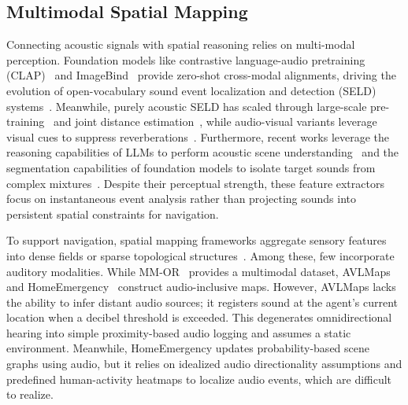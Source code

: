 \subsection{Multimodal Spatial Mapping}
Connecting acoustic signals with spatial reasoning relies on multi-modal perception. Foundation models like contrastive language-audio pretraining (CLAP)~\cite{CLAPLearningAudio2023} and ImageBind~\cite{ImageBindOneEmbedding2023} provide zero-shot cross-modal alignments, driving the evolution of open-vocabulary sound event localization and detection (SELD) systems~\cite{OpenvocabularySoundEvent2025}. Meanwhile, purely acoustic SELD has scaled through large-scale pre-training~\cite{PSELDNetsPretrainedNeural2025} and joint distance estimation~\cite{ExperimentalStudyJoint2025}, while audio-visual variants leverage visual cues to suppress reverberations~\cite{MVANetMultistageVideo2025}. Furthermore, recent works leverage the reasoning capabilities of LLMs to perform acoustic scene understanding~\cite{BATLearningReason2024} and the segmentation capabilities of foundation models to isolate target sounds from complex mixtures~\cite{SAMAudioSegment2025}. Despite their perceptual strength, these feature extractors focus on instantaneous event analysis rather than projecting sounds into persistent spatial constraints for navigation.

To support navigation, spatial mapping frameworks aggregate sensory features into dense fields or sparse topological structures~\cite{3DDynamicScene2020, ConceptFusionOpensetMultimodal2023, ConceptGraphsOpenvocabulary3D2024, ClioRealtimeTaskdriven2024, BareQueriesOpenvocabulary2025, M3DMapObjectawareMultimodal2025, DynamemOnlineDynamic2025}. Among these, few incorporate auditory modalities. While MM-OR~\cite{MMORLargeMultimodal2025} provides a multimodal dataset, AVLMaps~\cite{MultimodalSpatialLanguage2025} and HomeEmergency~\cite{HomeEmergencyUsingAudio2025} construct audio-inclusive maps. However, AVLMaps lacks the ability to infer distant audio sources; it registers sound at the agent's current location when a decibel threshold is exceeded. This degenerates omnidirectional hearing into simple proximity-based audio logging and assumes a static environment. Meanwhile, HomeEmergency updates probability-based scene graphs using audio, but it relies on idealized audio directionality assumptions and predefined human-activity heatmaps to localize audio events, which are difficult to realize.

